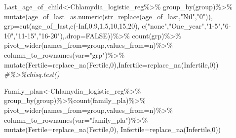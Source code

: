 \documentclass[
]{article}
\newenvironment{Shaded}{\begin{snugshade}}{\end{snugshade}}
\newcommand{\AttributeTok}[1]{\textcolor[rgb]{0.77,0.63,0.00}{#1}}
\newcommand{\CommentTok}[1]{\textcolor[rgb]{0.56,0.35,0.01}{\textit{#1}}}
\newcommand{\ConstantTok}[1]{\textcolor[rgb]{0.00,0.00,0.00}{#1}}
\newcommand{\DecValTok}[1]{\textcolor[rgb]{0.00,0.00,0.81}{#1}}
\newcommand{\FloatTok}[1]{\textcolor[rgb]{0.00,0.00,0.81}{#1}}
\newcommand{\FunctionTok}[1]{\textcolor[rgb]{0.00,0.00,0.00}{#1}}
\newcommand{\NormalTok}[1]{#1}
\newcommand{\OtherTok}[1]{\textcolor[rgb]{0.56,0.35,0.01}{#1}}
\newcommand{\SpecialCharTok}[1]{\textcolor[rgb]{0.00,0.00,0.00}{#1}}
\newcommand{\StringTok}[1]{\textcolor[rgb]{0.31,0.60,0.02}{#1}}
\begin{document}
\begin{Shaded}
\begin{Highlighting}[]
\NormalTok{Last\_age\_of\_child}\OtherTok{\textless{}{-}}\NormalTok{Chlamydia\_logistic\_reg}\SpecialCharTok{\%\textgreater{}\%}
  \FunctionTok{group\_by}\NormalTok{(group)}\SpecialCharTok{\%\textgreater{}\%}
  \FunctionTok{mutate}\NormalTok{(}\AttributeTok{age\_of\_last=}\FunctionTok{as.numeric}\NormalTok{(}\FunctionTok{str\_replace}\NormalTok{(age\_of\_last,}\StringTok{"Nil"}\NormalTok{,}\StringTok{"0"}\NormalTok{)),}
         \AttributeTok{grp=}\FunctionTok{cut}\NormalTok{(age\_of\_last,}\FunctionTok{c}\NormalTok{(}\SpecialCharTok{{-}}\ConstantTok{Inf}\NormalTok{,}\FloatTok{0.9}\NormalTok{,}\DecValTok{1}\NormalTok{,}\DecValTok{5}\NormalTok{,}\DecValTok{10}\NormalTok{,}\DecValTok{15}\NormalTok{,}\DecValTok{20}\NormalTok{),}
                 \FunctionTok{c}\NormalTok{(}\StringTok{"none"}\NormalTok{,}\StringTok{"One\_year"}\NormalTok{,}\StringTok{"1{-}5"}\NormalTok{,}\StringTok{"6{-}10"}\NormalTok{,}\StringTok{"11{-}15"}\NormalTok{,}\StringTok{"16{-}20"}\NormalTok{),}\AttributeTok{.drop=}\ConstantTok{FALSE}\NormalTok{))}\SpecialCharTok{\%\textgreater{}\%}
  \FunctionTok{count}\NormalTok{(grp)}\SpecialCharTok{\%\textgreater{}\%}
  \FunctionTok{pivot\_wider}\NormalTok{(}\AttributeTok{names\_from=}\NormalTok{group,}\AttributeTok{values\_from=}\NormalTok{n)}\SpecialCharTok{\%\textgreater{}\%}
  \FunctionTok{column\_to\_rownames}\NormalTok{(}\AttributeTok{var=}\StringTok{"grp"}\NormalTok{)}\SpecialCharTok{\%\textgreater{}\%}
  \FunctionTok{mutate}\NormalTok{(}\AttributeTok{Fertile=}\FunctionTok{replace\_na}\NormalTok{(Fertile,}\DecValTok{0}\NormalTok{),}\AttributeTok{Infertile=}\FunctionTok{replace\_na}\NormalTok{(Infertile,}\DecValTok{0}\NormalTok{))}
\CommentTok{\#\%\textgreater{}\%chisq.test()}

\NormalTok{Family\_plan}\OtherTok{\textless{}{-}}\NormalTok{Chlamydia\_logistic\_reg}\SpecialCharTok{\%\textgreater{}\%}
  \FunctionTok{group\_by}\NormalTok{(group)}\SpecialCharTok{\%\textgreater{}\%}\FunctionTok{count}\NormalTok{(family\_pla)}\SpecialCharTok{\%\textgreater{}\%}
  \FunctionTok{pivot\_wider}\NormalTok{(}\AttributeTok{names\_from=}\NormalTok{group,}\AttributeTok{values\_from=}\NormalTok{n)}\SpecialCharTok{\%\textgreater{}\%}
  \FunctionTok{column\_to\_rownames}\NormalTok{(}\AttributeTok{var=}\StringTok{"family\_pla"}\NormalTok{)}\SpecialCharTok{\%\textgreater{}\%}
  \FunctionTok{mutate}\NormalTok{(}\AttributeTok{Fertile=}\FunctionTok{replace\_na}\NormalTok{(Fertile,}\DecValTok{0}\NormalTok{),}
         \AttributeTok{Infertile=}\FunctionTok{replace\_na}\NormalTok{(Infertile,}\DecValTok{0}\NormalTok{))}


\end{Highlighting}
\end{Shaded}
\end{document}
